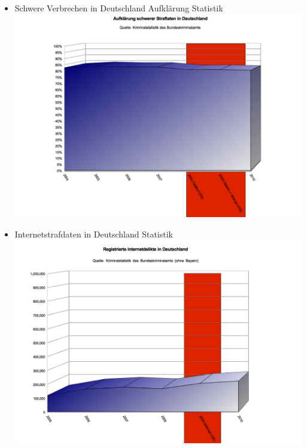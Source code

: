     \begin{frame}
\begin{itemize}
        \item Schwere Verbrechen in Deutschland Aufklärung Statistik
        \includegraphics[height=1\textheight]{sections/img/aufklaerung_in_DE.png}
    \end{itemize}
    \end{frame}
      \begin{frame}
\begin{itemize}
        \item Internetstrafdaten in Deutschland Statistik
        \includegraphics[height=1\textheight]{sections/img/internet_delikte_in_DE.png}
    \end{itemize}
    \end{frame}
